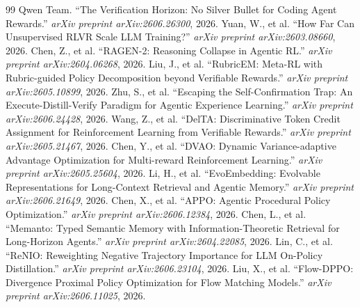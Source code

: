 \documentclass[11pt,a4paper]{article}
\begin{document}
\begin{thebibliography}{99}
 Qwen Team. ``The Verification Horizon: No Silver Bullet for Coding Agent Rewards.'' \emph{arXiv preprint arXiv:2606.26300}, 2026.
 Yuan, W., et al. ``How Far Can Unsupervised RLVR Scale LLM Training?'' \emph{arXiv preprint arXiv:2603.08660}, 2026.
 Chen, Z., et al. ``RAGEN-2: Reasoning Collapse in Agentic RL.'' \emph{arXiv preprint arXiv:2604.06268}, 2026.
 Liu, J., et al. ``RubricEM: Meta-RL with Rubric-guided Policy Decomposition beyond Verifiable Rewards.'' \emph{arXiv preprint arXiv:2605.10899}, 2026.
 Zhu, S., et al. ``Escaping the Self-Confirmation Trap: An Execute-Distill-Verify Paradigm for Agentic Experience Learning.'' \emph{arXiv preprint arXiv:2606.24428}, 2026.
 Wang, Z., et al. ``DelTA: Discriminative Token Credit Assignment for Reinforcement Learning from Verifiable Rewards.'' \emph{arXiv preprint arXiv:2605.21467}, 2026.
 Chen, Y., et al. ``DVAO: Dynamic Variance-adaptive Advantage Optimization for Multi-reward Reinforcement Learning.'' \emph{arXiv preprint arXiv:2605.25604}, 2026.
 Li, H., et al. ``EvoEmbedding: Evolvable Representations for Long-Context Retrieval and Agentic Memory.'' \emph{arXiv preprint arXiv:2606.21649}, 2026.
 Chen, X., et al. ``APPO: Agentic Procedural Policy Optimization.'' \emph{arXiv preprint arXiv:2606.12384}, 2026.
 Chen, L., et al. ``Memanto: Typed Semantic Memory with Information-Theoretic Retrieval for Long-Horizon Agents.'' \emph{arXiv preprint arXiv:2604.22085}, 2026.
 Lin, C., et al. ``ReNIO: Reweighting Negative Trajectory Importance for LLM On-Policy Distillation.'' \emph{arXiv preprint arXiv:2606.23104}, 2026.
 Liu, X., et al. ``Flow-DPPO: Divergence Proximal Policy Optimization for Flow Matching Models.'' \emph{arXiv preprint arXiv:2606.11025}, 2026.
\end{thebibliography}
\end{document}
